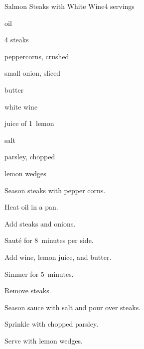 \begin{recipe}{Salmon Steaks with White Wine}{}{4 servings}

\begin{ingredients}
\item {} oil
\item 4   steaks
\item {} peppercorns, crushed
\item small onion, sliced
\item {} butter
\item {} white wine
\item juice of 1~lemon
\item salt
\item {} parsley, chopped
\item lemon wedges
\end{ingredients}

\begin{directions}
\item Season steaks with pepper corns.
\item Heat oil in a pan.
\item Add steaks and onions.
\item Saut\'e for 8~minutes per side.
\item Add wine, lemon juice, and butter.
\item Simmer for 5~minutes.
\item Remove steaks.
\item Season sauce with salt and pour over steaks.
\item Sprinkle with chopped parsley.
\item Serve with lemon wedges.
\end{directions}

\end{recipe}
